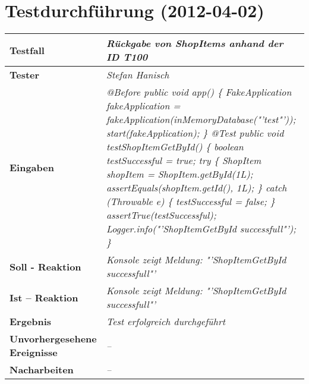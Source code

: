 
\chapter{Testdurchführung (2012-04-02)}


\begin{longtable}{|p{4cm}|p{11cm}|}
\hline
\textbf{Testfall} & \textit{Rückgabe von ShopItems anhand der ID \textbf{T100}} \\
\hline
\textbf{Tester} & \textit{Stefan Hanisch} \\
\hline
\textbf{Eingaben} & \textit{@Before \newline
public void app() \{ \newline
\hspace*{1mm}FakeApplication fakeApplication \newline
\hspace*{4mm}= fakeApplication(inMemoryDatabase("'test"'));\newline
\hspace*{1mm}start(fakeApplication); \newline
\} \newline
\newline
@Test \newline
public void testShopItemGetById() \{\newline
\hspace*{1mm}boolean testSuccessful = true; \newline
\hspace*{1mm}try \{\newline
\hspace*{3mm}ShopItem shopItem = ShopItem.getById(1L);\newline
\hspace*{3mm}assertEquals(shopItem.getId(), 1L);\newline
\hspace*{1mm}\} catch (Throwable e) \{ \newline
\hspace*{3mm}testSuccessful = false; \newline 
\hspace*{1mm}\} \newline
\hspace*{1mm}assertTrue(testSuccessful);\newline
\hspace*{1mm}Logger.info("'ShopItemGetById successfull"');\newline
\}
} \\
\hline
\textbf{Soll - Reaktion} & \textit{Konsole zeigt Meldung: "'ShopItemGetById successfull"'
} \\
\hline
\textbf{Ist -- Reaktion} & \textit{Konsole zeigt Meldung: "'ShopItemGetById successfull"'} \\
\hline
\textbf{Ergebnis} & \textit{Test erfolgreich durchgeführt} \\
\hline
\textbf{Unvorhergesehene Ereignisse} &
\textit{--} \\
\hline
\textbf{Nacharbeiten } & \textit{--} \\
\hline
\end{longtable}
